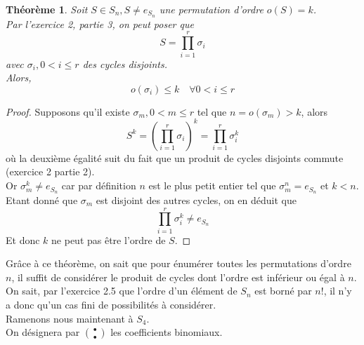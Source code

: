 \documentclass[11pt, a4paper]{article}
\newtheorem{theorem}{Théorème}
\begin{document}
\begin{theorem}
	Soit $S \in S_n, S \neq e_{S_n} $ une permutation d'ordre $o(S)=k$.\\
	Par l'exercice 2, partie 3, on peut poser que
	\[
		S = \prod_{i=1} ^{r} \sigma_i
	\]
	avec $\sigma_i, 0<i\leq r$ des cycles disjoints.\\
	Alors,
	\[ 
		o(\sigma_i) \leq k \quad \forall 0< i \leq r
	\]
\end{theorem}
\begin{proof}
	Supposons qu'il existe $\sigma_m, 0< m\leq r$ tel que $n=o(\sigma_m) > k$, alors
	 \[ 
		 S^{k}= \left(\prod_{i=1} ^{r} \sigma_i\right)^{k} = \prod_{i=1} ^{r} \sigma_i^{k}
	\]
	où la deuxième égalité suit du fait que un produit de cycles disjoints commute (exercice 2 partie 2).\\
	Or $\sigma_m^{k} \neq e_{S_n}$ car par définition $n$ est le plus petit entier tel que $\sigma_m^{n}=e_{S_n}$ et $k<n$.\\
	Etant donné que $\sigma_m$ est disjoint des autres cycles, on en déduit que 
	\[ 
\prod_{i=1} ^{r} \sigma_i^{k} \neq e_{S_n} 
	\]
	Et donc $k$ ne peut pas être l'ordre de $S$.
\end{proof}
Grâce à ce théorème, on sait que pour énumérer toutes les permutations d'ordre $n$, il suffit de considérer le produit de cycles dont l'ordre est inférieur ou égal à $n$.\\
On sait, par l'exercice 2.5 que l'ordre d'un élément de $S_n$ est borné par $n!$, il n'y a donc qu'un cas fini de possibilités à considérer.\\
Ramenons nous maintenant à $S_4$.\\
On désignera par $\binom{\bullet}{\bullet}$ les coefficients binomiaux.
\end{document}
